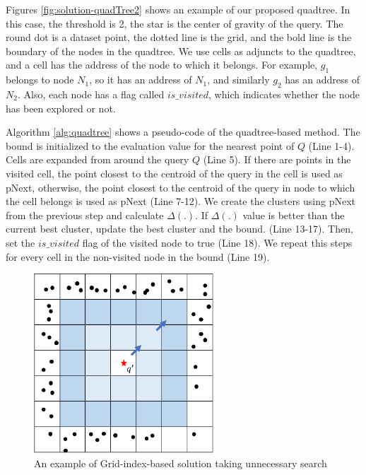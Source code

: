 \documentclass[a4paper,11pt]{report}
\theoremstyle{mytheoremstyle}
\begin{document}
Figures \ref{fig:solution-quadTree2} shows an example of our proposed quadtree. In this case, the threshold is 2, the star is the center of gravity of the query. The round dot is a dataset point, the dotted line is the grid, and the bold line is the boundary of the nodes in the quadtree. We use cells as adjuncts to the quadtree, and a cell has the address of the node to which it belongs. For example, $g_1$ belongs to node $N_1$, so it has an address of $N_1$, and similarly $g_2$ has an address of $N_2$. Also, each node has a flag called $is\_visited$, which indicates whether the node has been explored or not.

Algorithm \ref{alg:quadtree} shows a pseudo-code of the quadtree-based method. The bound is initialized to the evaluation value for the nearest point of $Q$ (Line 1-4). Cells are expanded from around the query $Q$ (Line 5). If there are points in the visited cell, the point closest to the centroid of the query in the cell is used as pNext, otherwise, the point closest to the centroid of the query in node to which the cell belongs is used as pNext (Line 7-12). We create the clusters using pNext from the previous step and calculate $\Delta(.)$. If $\Delta(.)$ value is better than the current best cluster, update the best cluster and the bound. (Line 13-17). Then, set the $is\_visited$ flag of the visited node to true (Line 18). We repeat this steps for every cell in the non-visited node in the bound (Line 19).

\begin{figure}
    \begin{center}
        \includegraphics[width=0.6\textwidth]{images/solution-QuadTree1.pdf}
        \caption{An example of Grid-index-based solution taking unnecessary search} \label{fig:solution-quadTree1}
    \end{center}
\end{figure}
\end{document}
